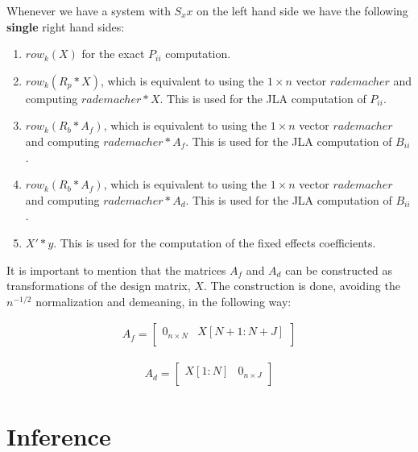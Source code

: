 \documentclass[12pt]{article}
\begin{document}
\clearpage 

Whenever we have a system with $S_xx$ on the left hand side we have the following \textbf{single} right hand sides: 

\begin{enumerate}
    \item $row_k(X)$ for the exact $P_{ii}$ computation.
    \item $row_k(R_p * X)$, which is equivalent to using the $1\times n$ vector $rademacher$ and computing $rademacher * X$. This is used for the JLA computation of $P_{ii}$.
    
    \item $row_k(R_b * A_f)$, which is equivalent to using the $1\times n$ vector $rademacher$ and computing $rademacher * A_f$. This is used for the JLA computation of $B_{ii}$.
    
    \item $row_k(R_b * A_f)$, which is equivalent to using the $1\times n$ vector $rademacher$ and computing $rademacher * A_d$. This is used for the JLA computation of $B_{ii}$.
    
    \item $X'*y$. This is used for the computation of the fixed effects coefficients.
\end{enumerate}

It is important to mention that the matrices $A_f$ and $A_d$ can be constructed as transformations of the design matrix, $X$. The construction is done, avoiding the $n^{-1/2}$ normalization and demeaning, in the following way: 

\begin{align}
    A_f =      \begin{bmatrix}
0_{n \times N} & X[N+1:N+J] \\
\end{bmatrix}   
\end{align}

\begin{align}
A_d  =   \begin{bmatrix}
  X[1:N] & 0_{n \times J} \\
\end{bmatrix}   
\end{align}




\clearpage
\section{Inference}
\end{document}
